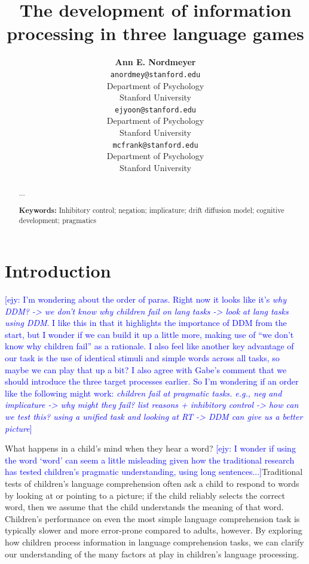 \documentclass[10pt,letterpaper]{article}
\title{The development of information processing in three language games}
\author{{\large \bf Ann E. Nordmeyer} \\
  \texttt{anordmey@stanford.edu} \\
  Department of Psychology \\
  Stanford University
  \And {\large \bf Erica J. Yoon} \\
  \texttt{ejyoon@stanford.edu} \\
  Department of Psychology \\
  Stanford University
  \And {\large \bf Michael C. Frank} \\
  \texttt{mcfrank@stanford.edu} \\
  Department of Psychology \\
  Stanford University}
\newcommand{\ejy}[1]{\textcolor{Blue}{[ejy: #1]}}  %
\begin{document}
\maketitle


\begin{abstract}

...

\textbf{Keywords:} 
Inhibitory control; negation; implicature; drift diffusion model; cognitive development; pragmatics

\end{abstract}


\section{Introduction}

\ejy{I'm wondering about the order of paras. Right now it looks like it's \emph{why DDM? -> we don't know why children fail on lang tasks -> look at lang tasks using DDM}. I like this in that it highlights the importance of DDM from the start, but I wonder if we can build it up a little more, making use of ``we don't know why children fail'' as a rationale. I also feel like another key advantage of our task is the use of identical stimuli and simple words across all tasks, so maybe we can play that up a bit? I also agree with Gabe's comment that we should introduce the three target processes earlier. So I'm wondering if an order like the following might work: \emph{children fail at pragmatic tasks. e.g., neg and implicature -> why might they fail? list reasons + inhibitory control -> how can we test this? using a unified task and looking at RT -> DDM can give us a better picture}}

What happens in a child's mind when they hear a word?  \ejy{I wonder if using the word `word' can seem a little misleading given how the traditional research has tested children's pragmatic understanding, using long sentences...}Traditional tests of children's language comprehension often ask a child to respond to words by looking at or pointing to a picture; if the child reliably selects the correct word, then we assume that the child understands the meaning of that word.  Children's performance on even the most simple language comprehension task is typically slower and more error-prone compared to adults, however.  By exploring how children process information in language comprehension tasks, we can clarify our understanding of the many factors at play in children's language processing.
\end{document}
